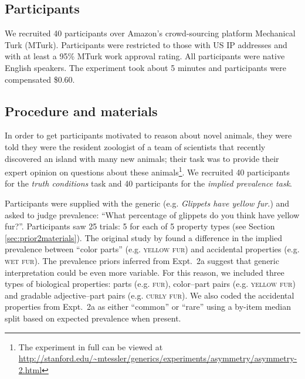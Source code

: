 \documentclass[10pt,letterpaper]{article}
\begin{document}
\subsection{Participants}

We recruited 40 participants over Amazon's crowd-sourcing platform Mechanical Turk (MTurk).  
Participants were restricted to those with US IP addresses and with at least a 95\% MTurk work approval rating. 
All participants were native English speakers. 
The experiment took about 5 minutes and participants were compensated \$0.60.

\subsection{Procedure and materials}
\label{sec:interpretationsMaterials}

In order to get participants motivated to reason about novel animals, they were told they were the resident zoologist of a team of scientists that recently discovered an island with many new animals; their task was to provide their expert opinion on questions about these animals\footnote{The experiment in full can be viewed at \url{http://stanford.edu/~mtessler/generics/experiments/asymmetry/asymmetry-2.html}}. 
We recruited 40 participants for the \emph{truth conditions} task and 40 participants for the \emph{implied prevalence task}. 

Participants were supplied with the generic (e.g. \emph{Glippets have yellow fur.}) and asked to judge prevalence: ``What percentage of glippets do you think have yellow fur?''. 
Participants saw 25 trials: 5 for each of 5 property types (see Section \ref{sec:prior2materials}).
The original study by \citeauthor{Cimpian2010} found a difference in the implied prevalence between ``color parts'' (e.g. \textsc{yellow fur}) and accidental properties (e.g. \textsc{wet fur}).
The prevalence priors inferred from Expt.~2a suggest that generic interpretation could be even more variable.
For this reason, we included three types of biological properties: parts (e.g. \textsc{fur}), color--part pairs (e.g. \textsc{yellow fur}) and gradable adjective--part pairs (e.g. \textsc{curly fur}). 
We also coded the accidental properties from Expt.~2a as either ``common'' or ``rare'' using a by-item median split based on expected prevalence when present.
\end{document}
